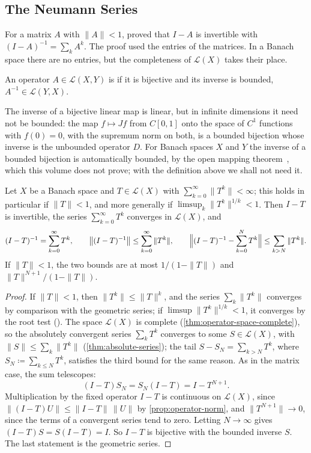\subsection{The Neumann Series}

For a matrix $A$ with $\|A\|<1$,  proved that $I-A$ is invertible with $(I-A)^{-1}=\sum_kA^k$. The proof used the entries of the matrices. In a Banach space there are no entries, but the completeness of $\mathcal L(X)$ takes their place.

\begin{definition}
\label{def:invertible-operator}
An operator $A\in\mathcal L(X,Y)$ is  if it is bijective and its inverse is bounded, $A^{-1}\in\mathcal L(Y,X)$.
\end{definition}

The inverse of a bijective linear map is linear, but in infinite dimensions it need not be bounded: the map $f\mapsto Jf$ from $C[0,1]$ onto the space of $C^1$ functions with $f(0)=0$, with the supremum norm on both, is a bounded bijection whose inverse is the unbounded operator $D$. For Banach spaces $X$ and $Y$ the inverse of a bounded bijection is automatically bounded, by the open mapping theorem~\cite[Sect.~5.3]{folland1999}, which this volume does not prove; with the definition above we shall not need it.

\begin{theorem}
\label{thm:neumann-banach}
Let $X$ be a Banach space and $T\in\mathcal L(X)$ with $\sum_{k=0}^\infty\|T^k\|<\infty$; this holds in particular if $\|T\|<1$, and more generally if $\limsup_k\|T^k\|^{1/k}<1$. Then $I-T$ is invertible, the series $\sum_{k=0}^\infty T^k$ converges in $\mathcal L(X)$, and
\[
(I-T)^{-1}=\sum_{k=0}^\infty T^k,\qquad\bigl\|(I-T)^{-1}\bigr\|\le\sum_{k=0}^\infty\|T^k\|,\qquad\Bigl\|(I-T)^{-1}-\sum_{k=0}^NT^k\Bigr\|\le\sum_{k>N}\|T^k\| .
\]
If $\|T\|<1$, the two bounds are at most $1/(1-\|T\|)$ and $\|T\|^{N+1}/(1-\|T\|)$.
\end{theorem}

\begin{proof}
If $\|T\|<1$, then $\|T^k\|\le\|T\|^k$, and the series $\sum_k\|T^k\|$ converges by comparison with the geometric series; if $\limsup\|T^k\|^{1/k}<1$, it converges by the root test (). The space $\mathcal L(X)$ is complete (\cref{thm:operator-space-complete}), so the absolutely convergent series $\sum_kT^k$ converges to some $S\in\mathcal L(X)$, with $\|S\|\le\sum_k\|T^k\|$ (\cref{thm:absolute-series}); the tail $S-S_N=\sum_{k>N}T^k$, where $S_N\coloneqq\sum_{k\le N}T^k$, satisfies the third bound for the same reason. As in the matrix case, the sum telescopes:
\[
(I-T)S_N=S_N(I-T)=I-T^{N+1}.
\]
Multiplication by the fixed operator $I-T$ is continuous on $\mathcal L(X)$, since $\|(I-T)U\|\le\|I-T\|\,\|U\|$ by \cref{prop:operator-norm}, and $\|T^{N+1}\|\to0$, since the terms of a convergent series tend to zero. Letting $N\to\infty$ gives $(I-T)S=S(I-T)=I$. So $I-T$ is bijective with the bounded inverse $S$. The last statement is the geometric series.
\end{proof}

